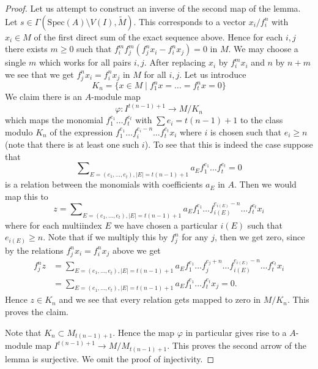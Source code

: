 \begin{proof}
\medskip\noindent
Let us attempt to construct an inverse of the second map of the lemma.
Let $s \in \Gamma(\text{Spec}(A) \setminus V(I), \widetilde{M})$.
This corresponds to a vector $x_i/f_i^n$ with $x_i \in M$ of the
first direct sum of the exact sequence above.
Hence for each $i, j$ there exists $m \geq 0$
such that $f_i^m f_j^m (f_j^n x_i - f_i^n x_j) = 0$ in $M$.
We may choose a single $m$ which works for all pairs $i, j$.
After replacing $x_i$ by $f_i^mx_i$ and $n$ by $n + m$ we see
that we get $f_j^nx_i = f_i^nx_j$ in $M$ for all $i, j$.
Let us introduce
$$
K_n = \{x \in M \mid f_1^nx = \ldots = f_t^nx = 0\}
$$
We claim there is an $A$-module map
$$
\varphi :
I^{t(n - 1) + 1}
\longrightarrow
M/K_n
$$
which maps the monomial
$f_1^{e_1} \ldots f_t^{e_t}$ with $\sum e_i = t(n - 1) + 1$
to the class modulo $K_n$ of the expression
$f_1^{e_1} \ldots f_i^{e_i - n} \ldots f_t^{e_t}x_i$
where $i$ is chosen such that $e_i \geq n$ (note that there
is at least one such $i$).
To see that this is indeed the case suppose that
$$
\sum\nolimits_{E = (e_1, \ldots, e_t), |E| = t(n - 1) + 1}
a_E f_1^{e_1} \ldots f_t^{e_t} = 0
$$
is a relation between the monomials with coefficients $a_E$ in $A$.
Then we would map this to
$$
z = 
\sum\nolimits_{E = (e_1, \ldots, e_t), |E| = t(n - 1) + 1}
a_E f_1^{e_1} \ldots f_{i(E)}^{e_{i(E)} - n} \ldots f_t^{e_t}x_i
$$
where for each multiindex $E$ we have chosen a particular $i(E)$
such that $e_{i(E)} \geq n$.
Note that if we multiply this by $f_j^n$ for any $j$, then
we get zero, since by the relations $f_j^nx_i = f_i^nx_j$ above we get
\begin{align*}
f_j^nz & = \sum\nolimits_{E = (e_1, \ldots, e_t), |E| = t(n - 1) + 1}
a_E f_1^{e_1} \ldots f_j^{e_j + n}
\ldots f_{i(E)}^{e_{i(E)} - n} \ldots f_t^{e_t}x_i \\
& = 
\sum\nolimits_{E = (e_1, \ldots, e_t), |E| = t(n - 1) + 1}
a_E f_1^{e_1} \ldots f_t^{e_t}x_j
= 0.
\end{align*}
Hence $z \in K_n$ and we see that every relation gets mapped to zero
in $M/K_n$. This proves the claim.

\medskip\noindent
Note that $K_n \subset M_{t(n - 1) + 1}$. Hence the 
map $\varphi$ in particular gives rise to a $A$-module map
$I^{t(n - 1) + 1} \to M/M_{t(n - 1) + 1}$.
This proves the second arrow of the lemma is surjective.
We omit the proof of injectivity.
\end{proof}

